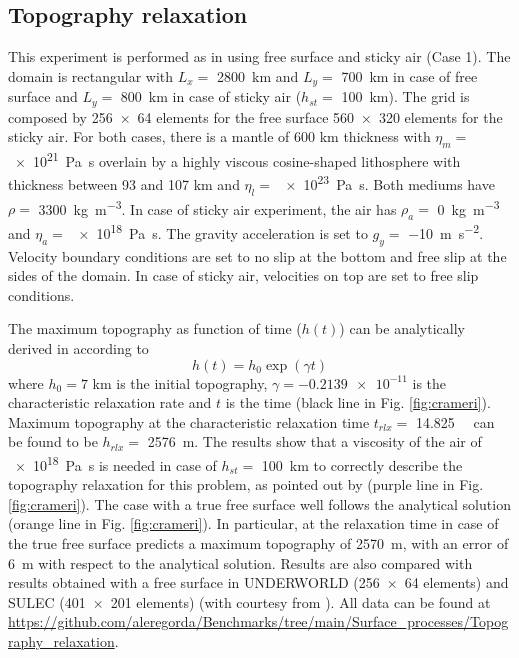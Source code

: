 \documentclass[hidelinks,10pt,a4paper]{article}
\begin{document}
\subsection{Topography relaxation}\label{sec:crameri}
This experiment is performed as in \citet{Crameri2012} using free surface and sticky air (Case 1). The domain is rectangular with $L_x=$ \SI{2800}{\km} and
$L_y=$ \SI{700}{\km} in case of free surface and $L_y=$ \SI{800}{\km} in case of sticky air ($h_{st}=$ \SI{100}{\km}). The grid is composed by \num{256x64}
elements for the free surface \num{560x320} elements for the sticky air. For both cases, there is a mantle of 600 km thickness with $\eta_m=$ \SI{e21}{\pascal\s}
overlain by a highly viscous cosine-shaped lithosphere with thickness between 93 and 107 km and $\eta_l=$ \SI{e23}{\pascal\s}. Both mediums have $\rho=$
\SI{3300}{\kg\per\cubic\metre}. In case of sticky air experiment, the air has $\rho_a=$ \SI{0}{\kg\per\cubic\metre} and $\eta_a=$ \SI{e18}{\pascal\s}. The
gravity acceleration is set to $g_y=$ \SI{-10}{\metre\per\square\s}. Velocity boundary conditions are set to no slip at the bottom and free slip at the sides
of the domain. In case of sticky air, velocities on top are set to free slip conditions.

The maximum topography as function of time ($h(t)$) can be analytically derived in according to \[h(t)=h_0 \exp(\gamma t)\]
where $h_0=7$ km is the initial topography, $\gamma=\num{-0.2139e-11}$ is the characteristic relaxation rate and $t$ is the time (black line in Fig.
\ref{fig:crameri}). Maximum topography at the characteristic relaxation time $t_{rlx}=$ \SI{14.825}{\kilo\year} can be found to be $h_{rlx}=$ \SI{2576}{\m}.
The results show that a viscosity of the air of \SI{e18}{\pascal\s} is needed in case of $h_{st}=$ \SI{100}{\km} to correctly describe the topography relaxation
for this problem, as pointed out by \citet{Crameri2012} (purple line in Fig. \ref{fig:crameri}). The case with a true free surface well follows the analytical
solution (orange line in Fig. \ref{fig:crameri}). In particular, at the relaxation time in case of the true free surface predicts a maximum topography of
\SI{2570}{\m}, with an error of \SI{6}{\m} with respect to the analytical solution. Results are also compared with results obtained with a free surface in
UNDERWORLD (\num{256x64} elements) and SULEC (\num{401x201} elements) (with courtesy from \citealp{Crameri2012}). All data can be 
found at \url{https://github.com/aleregorda/Benchmarks/tree/main/Surface_processes/Topography_relaxation}.
\end{document}
